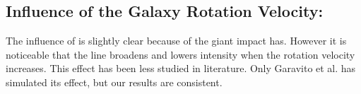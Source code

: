 \subsection{Influence of the Galaxy Rotation Velocity: \vrot}
The influence of \vrot is slightly clear because of the giant impact \vout has. However it is noticeable that the \lya line broadens and lowers intensity when the rotation velocity increases. This effect has been less studied in literature. Only Garavito et al. \cite{Garavito14} has simulated its effect, but our results are consistent. 
